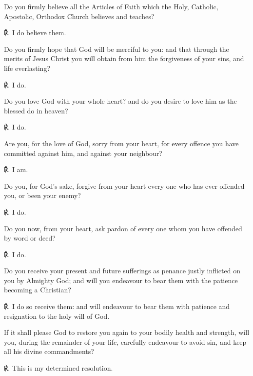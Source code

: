 \noindent
Do you firmly believe all the Articles of Faith which the Holy, Catholic, Apostolic, Orthodox Church believes and teaches?\par
℟. I do believe them.\par\noindent
Do you firmly hope that God will be merciful to you: and that through the merits of Jesus Christ you will obtain from him the forgiveness of your sins, and life everlasting?\par
℟. I do.\par\noindent
Do you love God with your whole heart? and do you desire to love him as the blessed do in heaven?\par
℟. I do.\par\noindent
Are you, for the love of God, sorry from your heart, for every offence you have committed against him, and against your neighbour?\par
℟. I am.\par\noindent
Do you, for God's sake, forgive from your heart every one who has ever offended you, or been your enemy?\par
℟. I do.\par\noindent
Do you now, from your heart, ask pardon of every one whom you have offended by word or deed?\par
℟. I do.\par\noindent
Do you receive your present and future sufferings as penance justly inflicted on you by Almighty God; and will you endeavour to bear them with the patience becoming a Christian?\par
℟. I do so receive them: and will endeavour to bear them with patience and resignation to the holy will of God.\par\noindent
If it shall please God to restore you again to your bodily health and strength, will you, during the remainder of your life, carefully endeavour to avoid sin, and keep all his divine commandments?\par
℟. This is my determined resolution.\par
